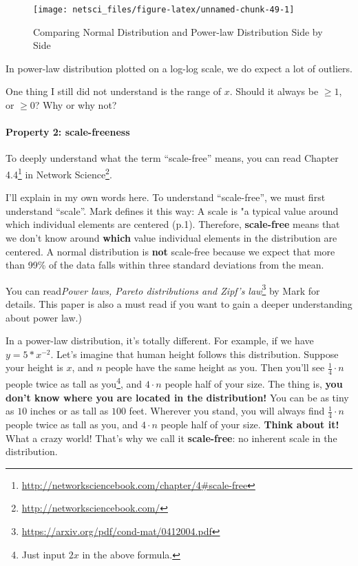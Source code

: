\documentclass[
]{krantz}
\makeatletter
\renewcommand{\href}[2]{#2\footnote{\url{#1}}}
\newenvironment{kframe}{%
\medskip{}
\setlength{\fboxsep}{.8em}
 \def\at@end@of@kframe{}%
 \ifinner\ifhmode%
  \def\at@end@of@kframe{\end{minipage}}%
  \begin{minipage}{\columnwidth}%
 \fi\fi%
 \def\FrameCommand##1{\hskip\@totalleftmargin \hskip-\fboxsep
 \colorbox{shadecolor}{##1}\hskip-\fboxsep
     \hskip-\linewidth \hskip-\@totalleftmargin \hskip\columnwidth}%
 \MakeFramed {\advance\hsize-\width
   \@totalleftmargin\z@ \linewidth\hsize
   \@setminipage}}%
 {\par\unskip\endMakeFramed%
 \at@end@of@kframe}
\newenvironment{rmdblock}[1]
  {
  \begin{itemize}
  \renewcommand{\labelitemi}{
    \raisebox{-.7\height}[0pt][0pt]{
      {\setkeys{Gin}{width=3em,keepaspectratio}\texttt{[image: images/\#1]}}
    }
  }
  \setlength{\fboxsep}{1em}
  \begin{kframe}
  \item
  }
  {
  \end{kframe}
  \end{itemize}
  }
\newenvironment{rmdreminder}
  {\begin{rmdblock}{reminder}}
  {\end{rmdblock}}
\makeatother
\begin{document}
\begin{figure}

{\centering \texttt{[image: netsci\_files/figure-latex/unnamed-chunk-49-1]} 

}

\caption{Comparing Normal Distribution and Power-law Distribution Side by Side}\label{fig:unnamed-chunk-49}
\end{figure}

In power-law distribution plotted on a log-log scale, we do expect a lot of outliers.

\begin{rmdreminder}
One thing I still did not understand is the range of \(x\). Should it always be \(\ge 1\), or \(\ge 0\)? Why or why not?
\end{rmdreminder}

\hypertarget{property-2-scale-freeness}{%
\paragraph{Property 2: scale-freeness}\label{property-2-scale-freeness}}

To deeply understand what the term ``scale-free'' means, you can read \href{http://networksciencebook.com/chapter/4\#scale-free}{Chapter 4.4} in \href{http://networksciencebook.com/}{Network Science}.

I'll explain in my own words here. To understand ``scale-free'', we must first understand ``scale''. Mark \citet{newman2005power} defines it this way: A scale is "a typical value around which individual elements are centered (p.1). Therefore, \textbf{scale-free} means that we don't know around \textbf{which} value individual elements in the distribution are centered. A normal distribution is \textbf{not} scale-free because we expect that more than 99\% of the data falls within three standard deviations from the mean.

You can read\href{https://arxiv.org/pdf/cond-mat/0412004.pdf}{\emph{Power laws, Pareto distributions and Zipf's law}} by Mark \citet{newman2005power} for details. This paper is also a must read if you want to gain a deeper understanding about power law.)

In a power-law distribution, it's totally different. For example, if we have \(y = 5*x^{-2}\). Let's imagine that human height follows this distribution. Suppose your height is \(x\), and \(n\) people have the same height as you. Then you'll see \(\frac{1}{4} \cdot n\) people twice as tall as you\footnote{Just input \(2x\) in the above formula.}, and \(4 \cdot n\) people half of your size. The thing is, \textbf{you don't know where you are located in the distribution!} You can be as tiny as \(10\) inches or as tall as \(100\) feet. Wherever you stand, you will always find \(\frac{1}{4} \cdot n\) people twice as tall as you, and \(4 \cdot n\) people half of your size. \textbf{Think about it!} What a crazy world! That's why we call it \textbf{scale-free}: no inherent scale in the distribution.
\end{document}
